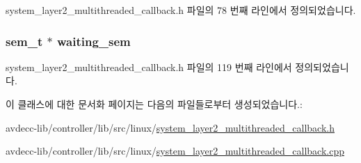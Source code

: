 system\+\_\+layer2\+\_\+multithreaded\+\_\+callback.\+h 파일의 78 번째 라인에서 정의되었습니다.

\subsubsection[{\texorpdfstring{waiting\+\_\+sem}{waiting_sem}}]{\setlength{\rightskip}{0pt plus 5cm}sem\+\_\+t $\ast$ waiting\+\_\+sem\hspace{0.3cm}{\ttfamily [private]}}\hypertarget{classavdecc__lib_1_1system__layer2__multithreaded__callback_a48196bb38ecccc4d99ae5c5d65e8b430}{}\label{classavdecc__lib_1_1system__layer2__multithreaded__callback_a48196bb38ecccc4d99ae5c5d65e8b430}


system\+\_\+layer2\+\_\+multithreaded\+\_\+callback.\+h 파일의 119 번째 라인에서 정의되었습니다.



이 클래스에 대한 문서화 페이지는 다음의 파일들로부터 생성되었습니다.\+:\begin{DoxyCompactItemize}
\item 
avdecc-\/lib/controller/lib/src/linux/\hyperlink{linux_2system__layer2__multithreaded__callback_8h}{system\+\_\+layer2\+\_\+multithreaded\+\_\+callback.\+h}\item 
avdecc-\/lib/controller/lib/src/linux/\hyperlink{linux_2system__layer2__multithreaded__callback_8cpp}{system\+\_\+layer2\+\_\+multithreaded\+\_\+callback.\+cpp}\end{DoxyCompactItemize}
